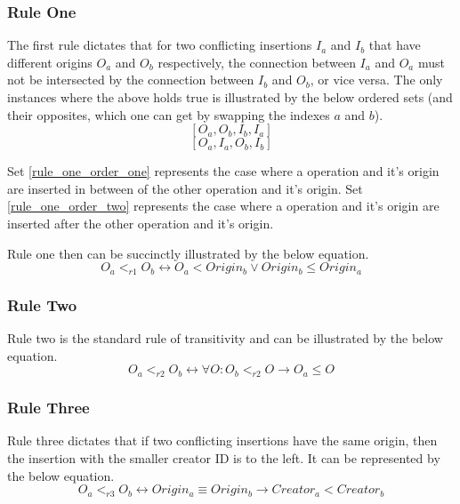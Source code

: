 \documentclass[9pt, titlepage]{article}
\begin{document}
  \subsubsection{Rule One}
  The first rule dictates that for two conflicting insertions \(I_{a}\) and \(I_{b}\) that have different origins \(O_{a}\) and \(O_{b}\) respectively,
  the connection between \(I_{a}\) and \(O_{a}\) must not be intersected by the connection between \(I_{b}\) and \(O_{b}\), or vice versa.
  The only instances where the above holds true is illustrated by the below ordered sets (and their opposites, which one can get by swapping the indexes \(a\) and \(b\)).
  \begin{equation} \label{rule_one_order_one}
    [O_{a}, O_{b}, I_{b}, I_{a}]
  \end{equation}
  \begin{equation} \label{rule_one_order_two}
    [O_{a}, I_{a}, O_{b}, I_{b}]
  \end{equation}

  Set \ref{rule_one_order_one} represents the case where a operation and it's origin are inserted in between of the other operation and it's origin.
  Set \ref{rule_one_order_two} represents the case where a operation and it's origin are inserted after the other operation and it's origin.

  Rule one then can be succinctly illustrated by the below equation.
  \begin{equation} \label{rule_one_equation}
    O_{a} <_{r1} O_{b} \leftrightarrow O_{a} < Origin_{b} \lor Origin_{b} \leq Origin_{a}
  \end{equation}

  \subsubsection{Rule Two}
  Rule two is the standard rule of transitivity and can be illustrated by the below equation.
  \begin{equation} \label{rule_two_equation}
    O_{a} <_{r2} O_{b} \leftrightarrow \forall O: O_{b} <_{r2} O \rightarrow O_{a} \leq O
  \end{equation}

  \subsubsection{Rule Three}
  Rule three dictates that if two conflicting insertions have the same origin, then the insertion with the smaller creator ID is to the left.
  It can be represented by the below equation.
  \begin{equation} \label{rule_three_equation}
    O_{a} <_{r3} O_{b} \leftrightarrow Origin_{a} \equiv Origin_{b} \rightarrow Creator_{a} < Creator_{b}
  \end{equation}
\end{document}
